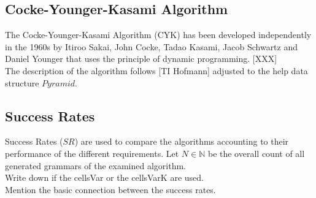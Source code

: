\subsection{ Cocke-Younger-Kasami Algorithm}
The Cocke-Younger-Kasami Algorithm (CYK) has been developed independently in the 1960s by Itiroo Sakai, John Cocke, Tadao Kasami, Jacob Schwartz and Daniel Younger that uses the principle of dynamic programming. [XXX]\\
The description of the algorithm follows [TI Hofmann] adjusted to the help data structure $Pyramid$. \\

\noindent {}


\subsection{Success Rates}
\noindent Success Rates ($SR$) are used to compare the algorithms accounting to their performance of the different requirements. Let $N \in  \mathbb{N}$ be the overall count of all generated grammars of the examined algorithm.\\

\noindent Write down if the cellsVar or the cellsVarK are used.\\
Mention the basic connection between the success rates.\\



